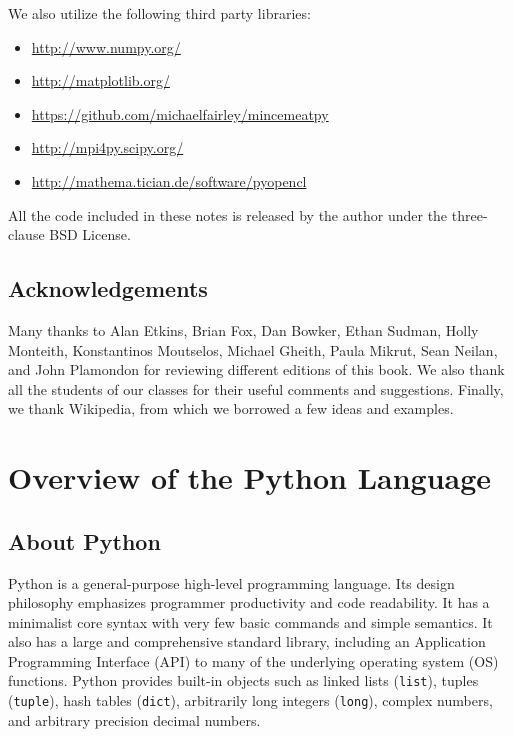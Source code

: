 \documentclass[justified,sixbynine]{tufte-book}
\def\ft{\small\tt}
\theoremstyle{plain}%
\theoremstyle{definition}
\theoremstyle{remark}
\begin{document}
\begin{fullwidth}
We also utilize the following third party libraries:

\begin{itemize}
\item \url{http://www.numpy.org/}
\item \url{http://matplotlib.org/}
\item \url{https://github.com/michaelfairley/mincemeatpy}
\item \url{http://mpi4py.scipy.org/}
\item \url{http://mathema.tician.de/software/pyopencl}
\end{itemize}

All the code included in these notes is released by the author under the three-clause BSD License.

\section*{Acknowledgements}

Many thanks to Alan Etkins, Brian Fox, Dan Bowker, Ethan Sudman, Holly Monteith, Konstantinos Moutselos, Michael Gheith, Paula Mikrut, Sean Neilan, and John Plamondon for reviewing different editions of this book. We also thank all the students of our classes for their useful comments and suggestions. Finally, we thank Wikipedia, from which we borrowed a few ideas and examples.

\goodbreak\chapter{Overview of the Python Language}


\goodbreak\section{About Python}

Python is a general-purpose high-level programming language.
Its design philosophy emphasizes programmer productivity and code readability. It has a minimalist core syntax with very few basic commands and simple semantics. It also has a large and comprehensive standard library, including an Application Programming Interface (API)  to many of the underlying operating system (OS) functions. Python provides built-in objects such as linked lists ({\ft list}), tuples ({\ft tuple}), hash tables ({\ft dict}), arbitrarily long integers ({\ft long}), complex numbers, and arbitrary precision decimal numbers.


\end{fullwidth}
\end{document}
